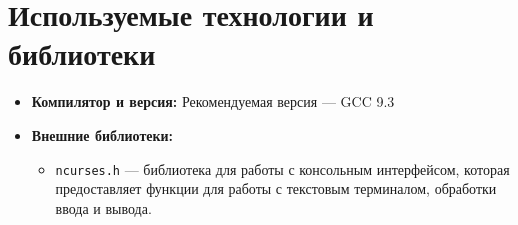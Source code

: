 \documentclass{article}
\begin{document}
\section{Используемые технологии и библиотеки}

\begin{itemize}
    \item \textbf{Компилятор и версия:} Рекомендуемая версия — GCC 9.3
    \item \textbf{Внешние библиотеки:}
    \begin{itemize}
        \item \texttt{ncurses.h} — библиотека для работы с консольным интерфейсом, которая предоставляет функции для работы с текстовым терминалом, обработки ввода и вывода.
    \end{itemize}
\end{itemize}
\end{document}
